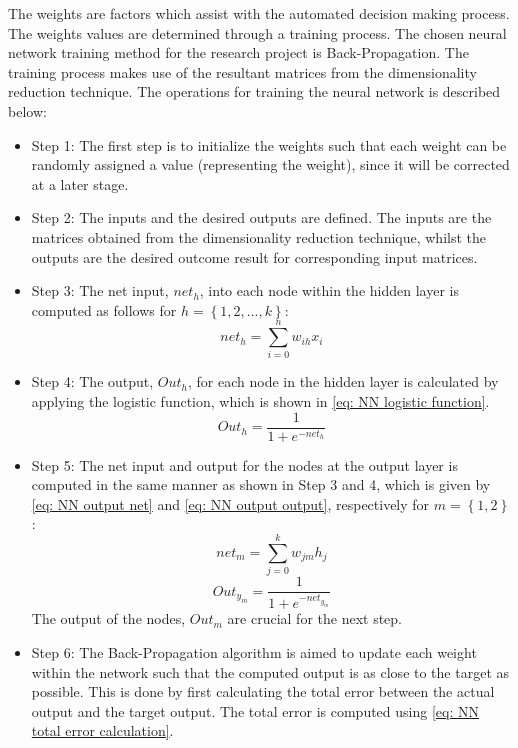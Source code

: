 \documentclass[11pt]{article}
\begin{document}
	The weights are factors which assist with the automated decision making process. The weights values are determined through a training process. The chosen neural network training method for the research project is Back-Propagation. The training process makes use of the resultant matrices from the dimensionality reduction technique. The operations for training the neural network is described below:
	\begin{itemize}
		\item Step 1: The first step is to initialize the weights such that each weight can be randomly assigned a value (representing the weight), since it will be corrected at a later stage.\\
		\item Step 2: The inputs and the desired outputs are defined. The inputs are the matrices obtained from the dimensionality reduction technique, whilst the outputs are the desired outcome result for corresponding input matrices.\\
		\item Step 3: The net input, $net_{h}$, into each node within the hidden layer is computed as follows for $h = \left\{1, 2, ..., k\right\}$:
	\begin{equation}
		net_{h} = \sum_{i = 0}^{n} w_{ih}x_i 
	\end{equation}
		\item Step 4: The output, $Out_h$, for each node in the hidden layer is calculated by applying the logistic function, which is shown in \eqref{eq: NN logistic function}.
	\begin{equation}
		Out_{h} = \frac{1}{1 + e^{-net_{h}}}
		\label{eq: NN logistic function}
	\end{equation}
		\item Step 5: The net input and output for the nodes at the output layer is computed in the same manner as shown in Step 3 and 4, which is given by \eqref{eq: NN output net} and \eqref{eq: NN output output}, respectively for $m = \left\{1, 2\right\}$:
	\begin{equation}
		net_{m} = \sum_{j = 0}^{k} w_{jm}h_j
		\label{eq: NN output net}
	\end{equation}
	\begin{equation}
		Out_{y_m} = \frac{1}{1 + e^{-net_{y_m}}}
		\label{eq: NN output output}
	\end{equation}
	The output of the nodes, $Out_{m}$ are crucial for the next step. \\
		\item Step 6: The Back-Propagation algorithm is aimed to update each weight within the network such that the computed output is as close to the target as possible. This is done by first calculating the total error between the actual output and the target output. The total error is computed using \eqref{eq: NN total error calculation}.

\end{itemize}
\end{document}
